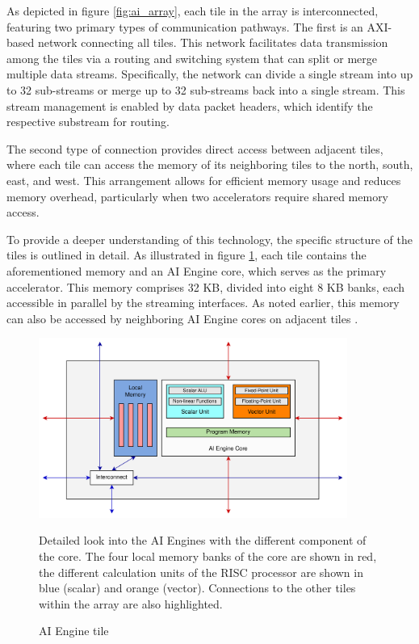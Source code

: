 As depicted in figure \ref{fig:ai_array}, each tile in the array is interconnected, featuring two primary types of communication pathways. The first is an AXI-based network connecting all tiles. This network facilitates data transmission among the tiles via a routing and switching system that can split or merge multiple data streams. Specifically, the network can divide a single stream into up to 32 sub-streams or merge up to 32 sub-streams back into a single stream. This stream management is enabled by data packet headers, which identify the respective substream for routing.\par
The second type of connection provides direct access between adjacent tiles, where each tile can access the memory of its neighboring tiles to the north, south, east, and west. This arrangement allows for efficient memory usage and reduces memory overhead, particularly when two accelerators require shared memory access.\par
To provide a deeper understanding of this technology, the specific structure of the tiles is outlined in detail. As illustrated in figure \ref{fig:detail_tile}, each tile contains the aforementioned memory and an AI Engine core, which serves as the primary accelerator. This memory comprises 32 KB, divided into eight 8 KB banks, each accessible in parallel by the streaming interfaces. As noted earlier, this memory can also be accessed by neighboring AI Engine cores on adjacent tiles \cite{AMD_aie_k}.\par

\begin{figure}[h!]
    \centering
    \includegraphics[width=0.9\textwidth]{images/detail_tile.png}
    \captionsetup{justification=centering}
    \caption{AI Engine tile}
            Detailed look into the AI Engines with the different component of the core. The four local memory banks of the core are shown in red, the different calculation units of the RISC processor are shown in blue (scalar) and orange (vector). Connections to the other tiles within the array are also highlighted. 
    \label{fig:detail_tile}
\end{figure}

